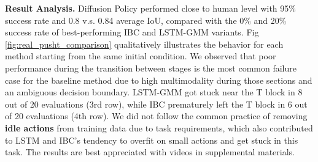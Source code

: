 \documentclass[Afour,sageh,times]{sagej}
\newcommand{\shuran}[1]{\textcolor{MyDarkGreen}{[Shuran: #1]}}
\begin{document}



\textbf{Result Analysis.}
Diffusion Policy performed close to human level with 95\% success rate and 0.8 v.s. 0.84 average IoU, compared with the 0\% and 20\% success rate of best-performing IBC and LSTM-GMM variants. Fig \ref{fig:real_pusht_comparison} qualitatively illustrates the behavior for each method starting from the same initial condition. 
We observed that poor performance during the transition between stages is the most common failure case for the baseline method due to high multimodality during those sections and an ambiguous decision boundary. LSTM-GMM got stuck near the T block in 8 out of 20 evaluations (3rd row), while IBC prematurely left the T block in 6 out of 20 evaluations (4th row). 
We did not follow the common practice of removing \textbf{idle actions} from training data due to task requirements, which also contributed to LSTM and IBC's tendency to overfit on small actions and get stuck in this task. The results are best appreciated with videos in supplemental materials.
\end{document}
